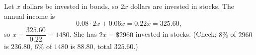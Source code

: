 Let $x$ dollars be invested in bonds, so $2x$ dollars are invested in stocks. The annual income is
\[0.08\cdot2x+0.06x=0.22x=325.60,\]
so $x=\dfrac{325.60}{0.22}=1480$. She has $2x=\boxed{\$2960}$ invested in stocks. (Check: $8\%$ of $2960$ is $236.80$, $6\%$ of $1480$ is $88.80$, total $325.60$.)
